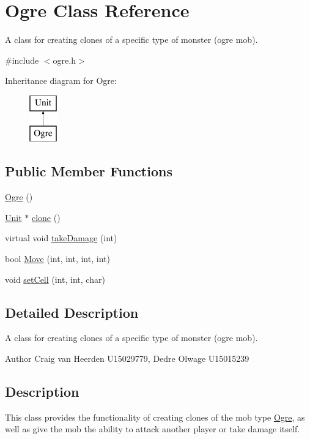 \hypertarget{class_ogre}{\section{\-Ogre \-Class \-Reference}
\label{class_ogre}
}


\-A class for creating clones of a specific type of monster (ogre mob).  




{\ttfamily \#include $<$ogre.\-h$>$}

\-Inheritance diagram for \-Ogre\-:\begin{figure}[H]
\begin{center}
\leavevmode
\includegraphics[height=2.000000cm]{class_ogre}
\end{center}
\end{figure}
\subsection*{\-Public \-Member \-Functions}
\begin{DoxyCompactItemize}
\item 
\hyperlink{class_ogre_aeb7c78cfd86de3a8e2175d87dac17c9f}{\-Ogre} ()
\item 
\hyperlink{class_unit}{\-Unit} $\ast$ \hyperlink{class_ogre_a0917522dc76d4a5f0779f0f09c64c832}{clone} ()
\item 
virtual void \hyperlink{class_ogre_a25d2dc4d79c25dbbb6b8b5d689de5bc2}{take\-Damage} (int)
\item 
bool \hyperlink{class_ogre_aba1062080ab136a62cb58edd3c7be955}{\-Move} (int, int, int, int)
\item 
void \hyperlink{class_ogre_afe986794a4a6d00691670c741f42beca}{set\-Cell} (int, int, char)
\end{DoxyCompactItemize}


\subsection{\-Detailed \-Description}
\-A class for creating clones of a specific type of monster (ogre mob). 

\begin{DoxyAuthor}{\-Author}
\-Craig van \-Heerden \-U15029779, \-Dedre \-Olwage \-U15015239
\end{DoxyAuthor}
\hypertarget{class_unit_factory_Description}{}\subsection{\-Description}\label{class_unit_factory_Description}
\-This class provides the functionality of creating clones of the mob type \hyperlink{class_ogre}{\-Ogre}, as well as give the mob the ability to attack another player or take damage itself. 

